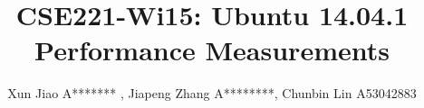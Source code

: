 \documentclass{sig-alternate}
\begin{document}
\title{CSE221-Wi15: Ubuntu 14.04.1 Performance Measurements}
\author{Xun Jiao A******* , Jiapeng Zhang A********, Chunbin Lin A53042883}

\maketitle



{\small


}

\end{document}
